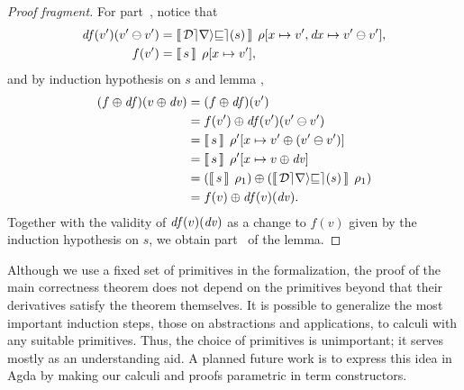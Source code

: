 \begin{oldSec}
\begin{proof}[Proof fragment]
For part~,
notice that
\begin{align*}
\D f(v')(\Diff{v'}{v'})
& = \mean[\Gr[x\mapsto v',\D x\mapsto\Diff{v'}{v'}]]{\Derive
s},\\
f(v')
& = \mean[\Gr[x\mapsto v']]s,
\end{align*}
and by induction hypothesis on $s$ and lemma ,
\begin{align*}
(\Apply{\D f}f)(\Apply{\D v}v)
& = (\Apply{\D f}f)(v')\\
& = \Apply{\D f(v')(\Diff{v'}{v'})}{f(v')}\\
& = \mean[\Gr'[x\mapsto\Apply{\Diff*{v'}{v'}}{v'}]]{s}\\
& = \mean[\Gr'[x\mapsto\Apply{\D v}{v}]]s\\
& = \Apply{\mean*[\Gr_1]{\Derive s}}
          {\mean*[\Gr_1]s}\\
& = \Apply{\D f(v)(\D v)}{f(v)}.
\end{align*}
Together with the validity of $\mathit{df}(v)(\mathit{dv})$ as a change to
$f(v)$ given by the induction hypothesis on $s$, we obtain
part~ of the lemma.
\end{proof}


Although we use a fixed set of primitives in the formalization,
the proof of the main correctness theorem does not depend on the
primitives beyond that their derivatives satisfy the
theorem themselves. It is possible to generalize the most
important induction steps, those on abstractions and
applications, to calculi with any suitable primitives. Thus, the
choice of primitives is unimportant; it serves mostly as an
understanding aid. A planned future work is to express this idea
in Agda by making our calculi and proofs parametric in term
constructors. 


\end{oldSec}
